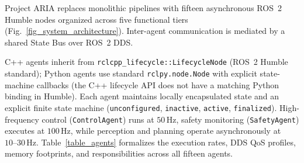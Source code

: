 \documentclass[journal]{IEEEtran}
\begin{document}
Project ARIA replaces monolithic pipelines with fifteen asynchronous ROS~2 Humble nodes organized across five functional tiers (Fig.~\ref{fig_system_architecture}). Inter-agent communication is mediated by a shared State Bus over ROS~2 DDS.

C++ agents inherit from \texttt{rclcpp\_lifecycle::LifecycleNode} (ROS~2 Humble standard); Python agents use standard \texttt{rclpy.node.Node} with explicit state-machine callbacks (the C++ lifecycle API does not have a matching Python binding in Humble). Each agent maintains locally encapsulated state and an explicit finite state machine (\texttt{unconfigured}, \texttt{inactive}, \texttt{active}, \texttt{finalized}). High-frequency control (\texttt{ControlAgent}) runs at $50$\,Hz, safety monitoring (\texttt{SafetyAgent}) executes at $100$\,Hz, while perception and planning operate asynchronously at $10\text{--}30$\,Hz. Table~\ref{table_agents} formalizes the execution rates, DDS QoS profiles, memory footprints, and responsibilities across all fifteen agents.
\end{document}
